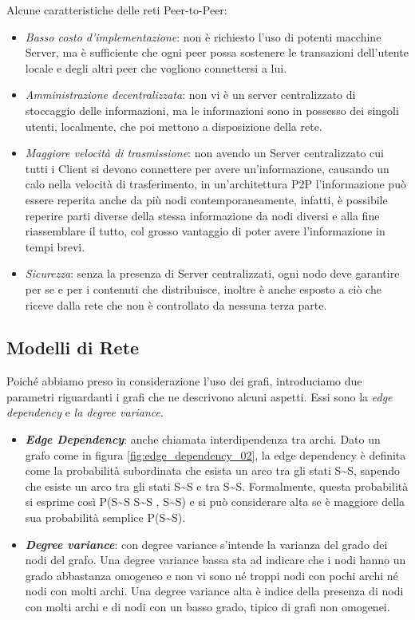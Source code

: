 Alcune caratteristiche delle reti Peer-to-Peer:
\begin{itemize}
	\item \textit{Basso costo d'implementazione}: non è richiesto l’uso di potenti macchine Server, ma è sufficiente che ogni peer possa sostenere le transazioni dell'utente locale e degli altri peer che vogliono connettersi a lui.
	\item \textit{Amministrazione decentralizzata}: non vi è un server centralizzato di stoccaggio delle informazioni, ma le informazioni sono in possesso dei singoli utenti, localmente, che poi mettono a disposizione della rete.
	\item \textit{Maggiore velocità di trasmissione}: non avendo un Server centralizzato cui tutti i Client si devono connettere per avere un'informazione, causando un calo nella velocità di trasferimento, in un'architettura \acs{P2P} l'informazione può essere reperita anche da più nodi contemporaneamente, infatti, è possibile reperire parti diverse della stessa informazione da nodi diversi e alla fine riassemblare il tutto, col grosso vantaggio di poter avere l'informazione in tempi brevi.
	\item \textit{Sicurezza}: senza la presenza di Server centralizzati, ogni nodo deve garantire per se e per i contenuti che distribuisce, inoltre è anche esposto a ciò che riceve dalla rete che non è controllato da nessuna terza parte. 
\end{itemize}
\vskip 1cm

\subsection{Modelli di Rete}
\label{subsec:modelli_rete}
Poiché abbiamo preso in considerazione l’uso dei grafi, introduciamo due parametri riguardanti i grafi che ne descrivono alcuni aspetti. Essi sono la \textit{edge dependency} e \textit{la degree variance}.
\begin{itemize}
	\item \textbf{\textit{Edge Dependency}}: anche chiamata interdipendenza tra archi. Dato un grafo come in figura \ref{fig:edge_dependency_02}, la edge dependency è definita come la probabilità subordinata che esista un arco tra gli stati S\textasciitilde S, sapendo che esiste un arco tra gli stati S\textasciitilde S e tra S\textasciitilde S. Formalmente, questa probabilità si esprime così P(S\textasciitilde S \textbar\: S\textasciitilde S , S\textasciitilde S) e si può considerare alta se è maggiore della sua probabilità semplice P(S\textasciitilde S).
	\item \textbf{\textit{Degree variance}}: con degree variance s'intende la varianza del grado dei nodi del grafo. Una degree variance bassa sta ad indicare che i nodi hanno un grado abbastanza omogeneo e non vi sono né troppi nodi con pochi archi né nodi con molti archi. Una degree variance alta è indice della presenza di nodi con molti archi e di nodi con un basso grado, tipico di grafi non omogenei.
\end{itemize}
\bigskip

